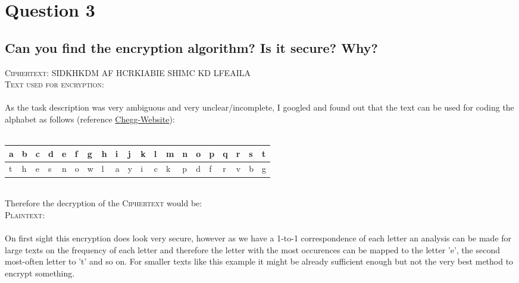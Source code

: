 \documentclass{report}
\begin{document}
	\section{Question 3}
	\startsection
		\renewcommand{\thesubsection}{\thesection.\Alph{subsection}}
		\subsection{Can you find the encryption algorithm? Is it secure? Why?}
		\startsubsection
			\textsc{Ciphertext}: SIDKHKDM AF HCRKIABIE SHIMC KD LFEAILA \\
			\textsc{Text used for encryption}:  \\ \\
			As the task description was very ambiguous and very unclear/incomplete, I googled and found out that the text can be used for coding the alphabet as follows (reference \href{https://www.chegg.com/homework-help/cryptography-and-network-security-7th-edition-chapter-3-problem-5p-solution-9780134444635}{Chegg-Website}): \\ \\
			\begin{tabular}{|M{0.3cm}|M{0.3cm}|M{0.3cm}|M{0.3cm}|M{0.3cm}|M{0.3cm}|M{0.3cm}|M{0.3cm}|M{0.3cm}|M{0.3cm}|M{0.3cm}|M{0.3cm}|M{0.3cm}|M{0.3cm}|M{0.3cm}|M{0.3cm}|M{0.3cm}|M{0.3cm}|M{0.3cm}|M{0.3cm}|}
				\hline
				a & b & c & d & e & f & g & h & i & j & k & l & m & n & o & p & q & r & s & t \\
				\hline
				t & h & e & s & n & o & w & l & a & y & i & c & k & p & d & f & r & v & b & g \\
				\hline
			\end{tabular}
			\hfill \\
			Therefore the decryption of the \textsc{Ciphertext} would be: \\
			\textsc{Plaintext}:  \\ \\
			On first sight this encryption does look very secure, however as we have a 1-to-1 correspondence of each letter an analysis can be made for large texts on the frequency of each letter and therefore the letter with the most occurences can be mapped to the letter 'e', the second most-often letter to 't' and so on. For smaller texts like this example it might be already sufficient enough but not the very best method to encrypt something.
		\closesection
\end{document}
